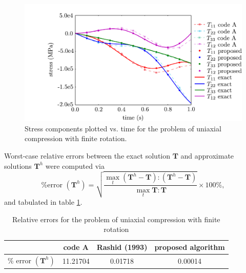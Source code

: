 \begin{figure}
\centering
\includegraphics[scale=0.75]{media/stretch_rotate.pdf}
\caption{Stress components plotted vs. time for the problem of uniaxial compression with finite rotation.}
\label{fig.v1-cm1}
\end{figure}

Worst-case relative errors between the exact solution $\mathbf{T}$ and approximate solutions $\mathbf{T}^h$ were computed via
\begin{equation}
    \text{\% error } (\mathbf{T}^h) = \sqrt{\frac{\max_{t} (\mathbf{T}^h - \mathbf{T}) \colon (\mathbf{T}^h - \mathbf{T})}{\max_{t} \mathbf{T} \colon \mathbf{T}}} \times 100 \% ,
    \label{eq:relative_error}
\end{equation}
and tabulated in table \ref{tab.v1-cm1}.

\begin{table}[]
\centering
\caption{Relative errors for the problem of uniaxial compression with finite rotation}
\label{tab.v1-cm1}
\begin{tabular}{c|c|c|c}
& code A & Rashid (1993) & proposed algorithm  \\ \hline
\% error $(\mathbf{T}^h)$ & 11.21704 & 0.01718 & 0.00014
\end{tabular}
\end{table}

\FloatBarrier
